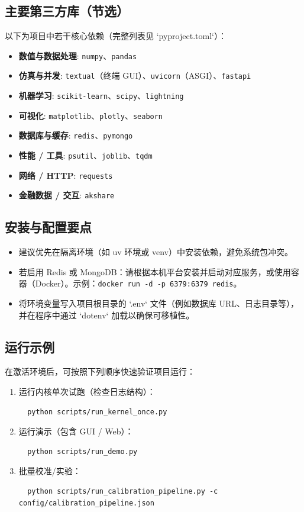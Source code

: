 \documentclass{mancls}
\begin{document}
\subsection{主要第三方库（节选）}
以下为项目中若干核心依赖（完整列表见 `pyproject.toml`）：
\begin{itemize}
  \item \textbf{数值与数据处理}: \texttt{numpy}、\texttt{pandas}
  \item \textbf{仿真与并发}: \texttt{textual}（终端 GUI）、\texttt{uvicorn}（ASGI）、\texttt{fastapi}
  \item \textbf{机器学习}: \texttt{scikit-learn}、\texttt{scipy}、\texttt{lightning}
  \item \textbf{可视化}: \texttt{matplotlib}、\texttt{plotly}、\texttt{seaborn}
  \item \textbf{数据库与缓存}: \texttt{redis}、\texttt{pymongo}
  \item \textbf{性能 / 工具}: \texttt{psutil}、\texttt{joblib}、\texttt{tqdm}
  \item \textbf{网络 / HTTP}: \texttt{requests}
  \item \textbf{金融数据 / 交互}: \texttt{akshare}
\end{itemize}

\subsection{安装与配置要点}
\begin{itemize}
  \item 建议优先在隔离环境（如 uv 环境或 venv）中安装依赖，避免系统包冲突。
  \item 若启用 Redis 或 MongoDB：请根据本机平台安装并启动对应服务，或使用容器（Docker）。示例：\verb|docker run -d -p 6379:6379 redis|。
  \item 将环境变量写入项目根目录的 `.env` 文件（例如数据库 URL、日志目录等），并在程序中通过 `dotenv` 加载以确保可移植性。
\end{itemize}

\subsection{运行示例}
在激活环境后，可按照下列顺序快速验证项目运行：
\begin{enumerate}
  \item 运行内核单次试跑（检查日志结构）：
  \begin{verbatim}
  python scripts/run_kernel_once.py
  \end{verbatim}
  \item 运行演示（包含 GUI / Web）：
  \begin{verbatim}
  python scripts/run_demo.py
  \end{verbatim}
  \item 批量校准/实验：
  \begin{verbatim}
  python scripts/run_calibration_pipeline.py -c config/calibration_pipeline.json
  \end{verbatim}
\end{enumerate}
\end{document}
